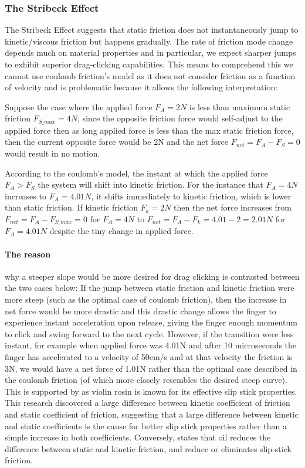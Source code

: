 \documentclass[12pt]{article}
\begin{document}
\subsubsection{The Stribeck Effect}
The Stribeck Effect suggests that static friction does not instantaneously jump to kinetic/viscous friction but happens gradually. The rate of friction mode change depends much on material properties and in particular, we expect sharper jumps to exhibit superior drag-clicking capabilities. This means to comprehend this we cannot use coulomb friction's model as it does not consider friction as a function of velocity and is problematic because it allows the following interpretation:
\par
    Suppose the case where the applied force $F_{A} = 2N$ is less than maximum static friction $F_{S\_max} = 4N$, since the opposite friction force would self-adjust to the applied force then as long applied force is less than the max static friction force, then the current opposite force would be 2N and the net force $F_{net} = F_{A} - F_{S} = 0$ would result in no motion.
\par
    According to the coulomb's model, the instant at which the applied force $F_{A} > F_{S}$ the system will shift into kinetic friction. For the instance that $F_{A} = 4N$ increases to $F_{A} = 4.01N$, it shifts immediately to kinetic friction, which is lower than static friction. If kinetic friction $F_{k} = 2N$ then the net force increases from $F_{net} = F_{A} - F_{S\_max} = 0$ for $F_{A} = 4N$ to $F_{net} = F_{A} - F_{k} = 4.01 - 2 = 2.01N$ for $F_{A} = 4.01N$ despite the tiny change in applied force.
\paragraph{The reason} why a steeper slope would be more desired for drag clicking is contrasted between the two cases below:
If the jump between static friction and kinetic friction were more steep (such as the optimal case of coulomb friction), then the increase in net force would be more drastic and this drastic change allows the finger to experience instant acceleration upon release, giving the finger enough momentum to click and swing forward to the next cycle.  
    However, if the transition were less instant, for example when applied force was 4.01N and after 10 microseconds the finger has accelerated to a velocity of 50cm/s and at that velocity the friction is 3N, we would have a net force of 1.01N rather than the optimal case described in the coulomb friction (of which more closely resembles the desired steep curve).
    This is supported by \parencite{woodhouse2025rosin} as violin rosin is known for its effective slip stick properties. This research discovered a large difference between kinetic coefficient of friction and static coefficient of friction, suggesting that a large difference between kinetic and static coefficients is the cause for better slip stick properties rather than a simple increase in both coefficients.
    Conversely, \parencite{lian2021transition} states that oil reduces the difference between static and kinetic friction, and reduce or eliminates slip-stick friction.
\end{document}
